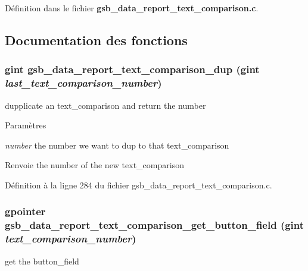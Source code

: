 Définition dans le fichier {\bf gsb\_\-data\_\-report\_\-text\_\-comparison.c}.



\subsection{Documentation des fonctions}
\subsubsection[{gsb\_\-data\_\-report\_\-text\_\-comparison\_\-dup}]{\setlength{\rightskip}{0pt plus 5cm}gint gsb\_\-data\_\-report\_\-text\_\-comparison\_\-dup (gint {\em last\_\-text\_\-comparison\_\-number})}\label{gsb__data__report__text__comparison_8c_a995e026448bba945f24812332212fdf9}
dupplicate an text\_\-comparison and return the number


\begin{DoxyParams}{Paramètres}
\item[{\em number}]the number we want to dup to that text\_\-comparison\end{DoxyParams}
\begin{DoxyReturn}{Renvoie}
the number of the new text\_\-comparison 
\end{DoxyReturn}


Définition à la ligne 284 du fichier gsb\_\-data\_\-report\_\-text\_\-comparison.c.

\subsubsection[{gsb\_\-data\_\-report\_\-text\_\-comparison\_\-get\_\-button\_\-field}]{\setlength{\rightskip}{0pt plus 5cm}gpointer gsb\_\-data\_\-report\_\-text\_\-comparison\_\-get\_\-button\_\-field (gint {\em text\_\-comparison\_\-number})}\label{gsb__data__report__text__comparison_8c_a39245ed55201b9a0c7f4379f4354f5fa}
get the button\_\-field


